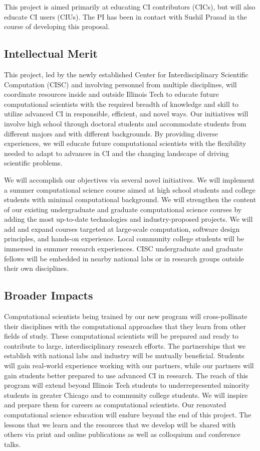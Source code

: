 \documentclass[11pt]{NSFamsart}
\begin{document}
This project is aimed primarily at educating CI contributors (CICs), but will also educate CI users (CIUs).  The PI has been in contact with Sushil Prasad in the course of developing this proposal.

\subsection*{Intellectual Merit}
This project, led by the newly established Center for Interdisciplinary Scientific Computation (CISC) and involving personnel from multiple disciplines, will coordinate resources inside and outside Illinois Tech to educate future computational scientists with the required breadth of knowledge and skill to utilize advanced CI in responsible, efficient, and novel ways. Our initiatives will involve high school through doctoral students and accommodate students from different majors and with different backgrounds.  By providing diverse experiences, we will educate future computational scientists with the flexibility needed to adapt to advances in CI and the changing landscape of driving scientific problems. 

We will accomplish our objectives via several novel initiatives.  We will implement a summer computational science course aimed at high school students and college students with minimal computational background.  We will strengthen the content of our existing undergraduate and graduate computational science courses by adding the most up-to-date technologies and industry-proposed projects.  We will add and expand courses targeted at large-scale computation, software design principles, and hands-on experience.  Local community college students will be immersed in summer research experiences.  CISC undergraduate and graduate fellows will be embedded in nearby national labs or in research groups outside their own disciplines.  

\subsection*{Broader Impacts}
Computational scientists being trained by our new program will cross-pollinate their disciplines with the computational approaches that they learn from other fields of study.  These computational scientists will be prepared and ready to contribute to large, interdisciplinary research efforts.  The partnerships that we establish with national labs and industry will be mutually beneficial.  Students will gain real-world experience working with our partners, while our partners will gain students better prepared to use advanced CI in research. The reach of this program will extend beyond Illinois Tech students to underrepresented minority students in greater Chicago and to community college students.  We will inspire and prepare them for careers as computational scientists. Our renovated computational science education will endure beyond the end of this project.  The lessons that we learn and the resources that we develop will be shared with others via print and online publications as well as colloquium and conference talks.
\end{document}
